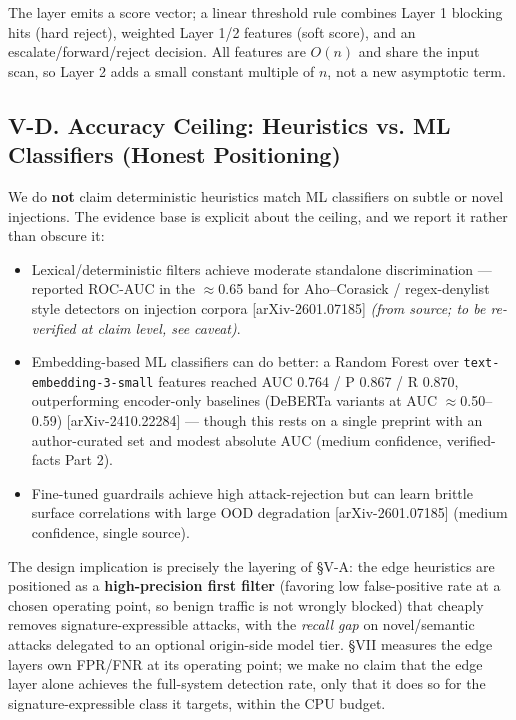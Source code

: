 The layer emits a score vector; a linear threshold rule combines Layer 1
blocking hits (hard reject), weighted Layer 1/2 features (soft score),
and an escalate/forward/reject decision. All features are \(O(n)\) and
share the input scan, so Layer 2 adds a small constant multiple of
\(n\), not a new asymptotic term.

\subsection{V-D. Accuracy Ceiling: Heuristics vs. ML Classifiers (Honest
Positioning)}\label{v-d-accuracy-ceiling-heuristics-vs-ml-classifiers-honest-positioning}

We do \textbf{not} claim deterministic heuristics match ML classifiers
on subtle or novel injections. The evidence base is explicit about the
ceiling, and we report it rather than obscure it:

\begin{itemize}
\tightlist
\item
  Lexical/deterministic filters achieve moderate standalone
  discrimination --- reported ROC-AUC in the $\approx$0.65 band for
  Aho--Corasick / regex-denylist style detectors on injection corpora
  {[}arXiv-2601.07185{]} \emph{(from source; to be re-verified at claim
  level, see caveat)}.
\item
  Embedding-based ML classifiers can do better: a Random Forest over
  \passthrough{\lstinline!text-embedding-3-small!} features reached AUC
  0.764 / P 0.867 / R 0.870, outperforming encoder-only baselines
  (DeBERTa variants at AUC $\approx$0.50--0.59) {[}arXiv-2410.22284{]} ---
  though this rests on a single preprint with an author-curated set and
  modest absolute AUC (medium confidence, verified-facts Part 2).
\item
  Fine-tuned guardrails achieve high attack-rejection but can learn
  brittle surface correlations with large OOD degradation
  {[}arXiv-2601.07185{]} (medium confidence, single source).
\end{itemize}

The design implication is precisely the layering of §V-A: the edge
heuristics are positioned as a \textbf{high-precision first filter}
(favoring low false-positive rate at a chosen operating point, so benign
traffic is not wrongly blocked) that cheaply removes
signature-expressible attacks, with the \emph{recall gap} on
novel/semantic attacks delegated to an optional origin-side model tier.
§VII measures the edge layer\textquotesingle s own FPR/FNR at its
operating point; we make no claim that the edge layer alone achieves the
full-system detection rate, only that it does so for the
signature-expressible class it targets, within the CPU budget.

